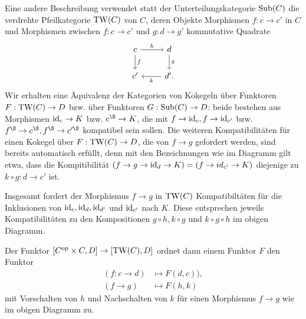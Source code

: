 \begin{bem}
  Eine andere Beschreibung verwendet statt der Unterteilungskategorie
  $\operatorname{Sub}(C)$ die verdrehte Pfeilkategorie $\operatorname{TW}(C)$ von $C$, deren
  Objekte Morphismen $f: c \to c'$ in $C$ und Morphismen zwischen $f:
  c \to c'$ und $g: d \to g'$ kommutative Quadrate
  \[ \begin{tikzcd}
    c \arrow{d}{f} \arrow{r}{h} & d \arrow{d}{g} \\
    c' & \arrow{l}{k} d'.
  \end{tikzcd} \]
  Wir erhalten eine Äquivalenz der Kategorien von Kokegeln über
  Funktoren $F: \operatorname{TW}(C) \to D$ bzw. über Funktoren $G: \operatorname{Sub}(C) \to D$:
  beide bestehen aus Morphismen $\operatorname{id}_c \to K$ bzw. $c^\S \to K$, die
  mit $f \to \operatorname{id}_c, f \to \operatorname{id}_{c'}$ bzw. $f^\S \to c^\S, f^\S \to
  c'^\S$ kompatibel sein sollen. Die weiteren Kompatibilitäten für
  einen Kokegel über $F: \operatorname{TW}(C) \to D$, die von $f \to g$ gefordert
  werden, sind bereits automatisch erfüllt, denn mit den Bezeichnungen
  wie im Diagramm gilt etwa, dass die Kompitibilität $(f \to g \to
  \operatorname{id}_d \to K) = (f \to id_{c'} \to K)$ diejenige zu $k \circ g: d \to
  c'$ ist.

  Insgesamt fordert der Morphismus $f \to g$ in $\operatorname{TW}(C)$
  Kompatibiltäten für die Inklusionen von $\operatorname{id}_c, \operatorname{id}_d, \operatorname{id}_{d'}$ und
  $\operatorname{id}_{c'}$ nach $K$. Diese entsprechen jeweils Kompatibilitäten zu
  den Kompositionen $g \circ h, k \circ g$ und $k \circ g \circ h$ im
  obigen Diagramm.

  Der Funktor $[C^\mathrm{op} \times C, D] \to [\operatorname{TW}(C), D]$ ordnet dann einem
  Funktor $F$ den Funktor
  \begin{align*}
    (f: c \to d) &\mapsto F(d, c)), \\
    (f \to g) &\mapsto F(h, k)
  \end{align*}
  mit Vorschalten von $h$ und Nachschalten von $k$ für einen
  Morphismus $f \to g$ wie im obigen Diagramm zu.
\end{bem}


